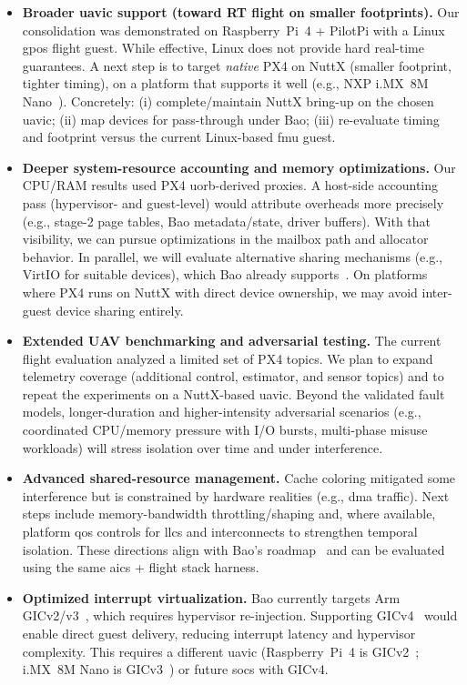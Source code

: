 \begin{itemize}

\item \textbf{Broader \gls{uavic} support (toward RT flight on smaller footprints).}
Our consolidation was demonstrated on Raspberry~Pi~4 + PilotPi with a Linux
\gls{gpos} flight guest. While effective, Linux does not provide hard real-time
guarantees. A next step is to target \emph{native} PX4 on NuttX (smaller
footprint, tighter timing), on a platform that supports it well (e.g., NXP
i.MX~8M Nano~\cite{imx8mn}). Concretely: (i) complete/maintain NuttX bring-up on
the chosen \gls{uavic}; (ii) map devices for pass-through under Bao; (iii)
re-evaluate timing and footprint versus the current Linux-based \gls{fmu} guest.

\item \textbf{Deeper system-resource accounting and memory optimizations.}
Our CPU/RAM results used PX4 \gls{uorb}-derived proxies. A host-side accounting
pass (hypervisor- and guest-level) would attribute overheads more precisely
(e.g., stage-2 page tables, Bao metadata/state, driver buffers). With that
visibility, we can pursue optimizations in the mailbox path and allocator
behavior. In parallel, we will evaluate alternative sharing mechanisms (e.g.,
VirtIO for suitable devices), which Bao already
supports~\cite{costa2022virtio,ribeiro2023virtio,rocha_mitigating_2023,peixoto-virtio-2024,baoRepo}. On
platforms where PX4 runs on NuttX with direct device ownership, we may avoid
inter-guest device sharing entirely.

\item \textbf{Extended UAV benchmarking and adversarial testing.}
The current flight evaluation analyzed a limited set of PX4 topics. We plan to
expand telemetry coverage (additional control, estimator, and sensor topics) and
to repeat the experiments on a NuttX-based \gls{uavic}. Beyond the validated
fault models, longer-duration and higher-intensity adversarial scenarios (e.g.,
coordinated CPU/memory pressure with I/O bursts, multi-phase misuse workloads)
will stress isolation over time and under interference.

\item \textbf{Advanced shared-resource management.}
Cache coloring mitigated some interference but is constrained by hardware
realities (e.g., \gls{dma} traffic). Next steps include memory-bandwidth
throttling/shaping and, where available, platform \gls{qos} controls for \glspl{llc}
and interconnects to strengthen temporal isolation. These directions align with
Bao’s roadmap~\cite{martins_et_al:OASIcs:2020:11779} and can be evaluated using
the same \gls{aics} + flight stack harness.

\item \textbf{Optimized interrupt virtualization.}
Bao currently targets Arm GICv2/v3~\cite{baoRepo}, which requires hypervisor
re-injection. Supporting GICv4~\cite{arm-gicv4} would enable direct guest
delivery, reducing interrupt latency and hypervisor complexity. This requires a
different \gls{uavic} (Raspberry~Pi~4 is GICv2~\cite{rpi4-datasheet,arm-gic400};
i.MX~8M Nano is GICv3~\cite{imx8mn-rm}) or future \glspl{soc} with GICv4.

\end{itemize}



